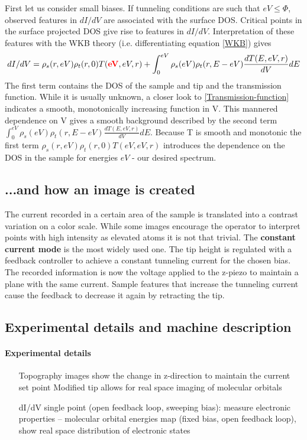 First let us consider small biases.
If tunneling conditions are such that $eV\leq\Phi$, observed features in $dI/dV$ are associated with the surface DOS. Critical points in the surface projected DOS give rise to features in $dI/dV$. Interpretation of these features with the WKB theory (i.e. differentiating equation \eqref{WKB}) gives
$$dI/dV=\rho_s(r,eV)\rho_t(r,0)T(\textcolor{red}{\textbf{eV}},eV,r)+\int_0^{eV}\rho_s(eV)\rho_t(r,E-eV)\frac{dT(E,eV,r)}{dV}dE$$
The first term contains the DOS of the sample and tip and the transmission function. While it is usually unknown, a closer look to \eqref{Transmission-function} indicates a smooth, monotonically increasing function in V. This mannered dependence on V gives a smooth background described by the second term $\int_0^{eV}\rho_s(eV)\rho_t(r,E-eV)\frac{dT(E,eV,r)}{dV}dE$.
Because T is smooth and monotonic the first term $\rho_s(r,eV)\rho_t(r,0)T(eV,eV,r)$ introduces the dependence on the DOS in the sample for energies $eV$ - our desired spectrum.

\subsection{...and how an image is created}
The current recorded in a certain area of the sample is translated into a contrast variation on a color scale. While some images encourage the operator to interpret points with high intensity as elevated atoms it is not that trivial. The \textbf{constant current mode} is the most widely used one. The tip height is regulated with a feedback controller to achieve a constant tunneling current for the chosen bias. The recorded information is now the voltage applied to the z-piezo to maintain a plane with the same current. Sample features that increase the tunneling current cause the feedback to decrease it again by retracting the tip.

\subsection{Experimental details and machine description}
\paragraph{Experimental details}

\begin{itemize}
	\item[Topography images] show the change in z-direction to maintain the current set point
	\subitem Modified tip allows for real space imaging of molecular orbitals
	\item[dI/dV]
	\subitem single point (open feedback loop, sweeping bias): measure electronic properties – molecular orbital energies
	\subitem map (fixed bias, open feedback loop), show real space distribution of electronic states
\end{itemize}

